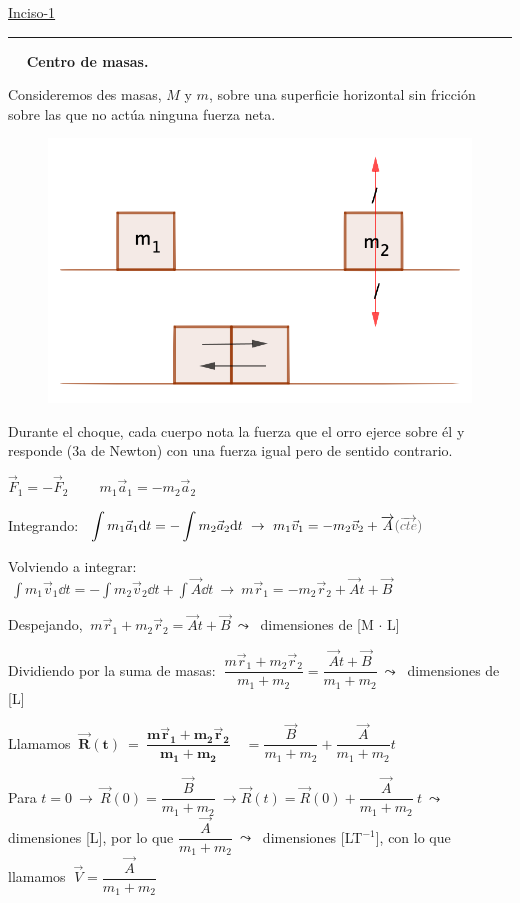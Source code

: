 \vspace{3mm}
\ul{Inciso-1} $\quad$ \rule{150pt}{0.1pt} $\quad$ \textbf{Centro de masas.}

Consideremos des masas, $M$ y $m$, sobre una superficie horizontal sin fricción sobre las que no actúa ninguna fuerza neta.
\begin{multicols}{2}
	
	\begin{figure}[H]
		\centering
		\includegraphics[width=.4\textwidth]{imagenes/img05-02.png}
	\end{figure}
	
	Durante el choque, cada cuerpo nota la fuerza que el orro ejerce sobre él y responde (3a de Newton) con una fuerza igual pero de sentido contrario.
	
$ \overrightarrow F_1=-\overrightarrow F_2 \qquad \ m_1\overrightarrow a_1=-m_2 \overrightarrow a_2	$
\end{multicols}

Integrando: $\ \displaystyle \int m_1 \vec a_1 	\dd t=-\int m_2 \vec a_2 \dd t \ \to \ m_1\vec v_1=-m_2\vec v_2+\overrightarrow A \textcolor{gris}{(\overrightarrow {cte})}$

Volviendo a integrar: $\ \displaystyle \int m_1\vec v_1 \dd t= - \int m_2\vec v_2 \dd t+ \int \overrightarrow A \dd t \ \to \ 
m\vec r_1 = -m_2\vec r_2 +\overrightarrow A t + \overrightarrow B$

Despejando, $\ m\vec r_1 + m_2\vec r_2 = \overrightarrow A t + \overrightarrow B \ \leadsto \ $ dimensiones de [M $\cdot$ L]

Dividiendo por la suma de masas: 
 $\ \dfrac{ m\vec r_1 + m_2\vec r_2}{m_1+m_2} = 
 \dfrac{ \overrightarrow A t + \overrightarrow B} {m_1+m_2} \ \leadsto \ $ dimensiones de [L]
 
 Llamamos $ \ \boldsymbol{ \overrightarrow R(t) \ = \ \dfrac{ m\vec r_1 + m_2\vec r_2}{m_1+m_2} } \quad = \dfrac{\overrightarrow B}{m_1+m_2} + \dfrac{\overrightarrow A}{m_1+m_2} t $
 
 Para $t=0 \ \to \ \overrightarrow R(0)=\dfrac{\overrightarrow B}{m_1+m_2} \ \to \overrightarrow R(t)=\overrightarrow R (0) + \dfrac{\overrightarrow A}{m_1+m_2} \ t \ \leadsto \ $ dimensiones [L], por lo que  $\dfrac{\overrightarrow A}{m_1+m_2} \ \leadsto \ $ dimensiones [LT$^{-1}$], con lo que llamamos $\ \overrightarrow V = \dfrac{\overrightarrow A}{m_1+m_2} $
 
